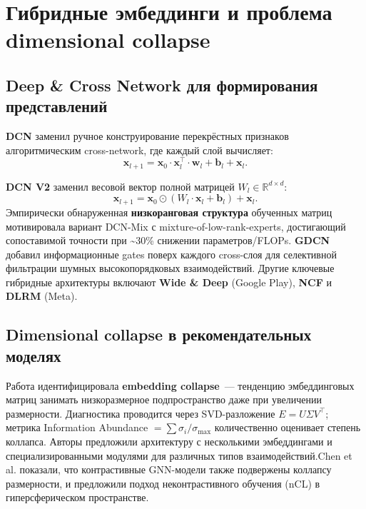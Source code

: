 \section{Гибридные эмбеддинги и проблема dimensional collapse}
\label{sec:ch1:embeddings}

\subsection{Deep \& Cross Network для формирования представлений}
\label{subsec:ch1:dcn}

\textbf{DCN} \cite{wang2017dcn} заменил ручное конструирование перекрёстных признаков алгоритмическим cross-network, где каждый слой вычисляет:
\begin{equation}
    \mathbf{x}_{l+1} = \mathbf{x}_0 \cdot \mathbf{x}_l^\top \cdot \mathbf{w}_l + \mathbf{b}_l + \mathbf{x}_l.
\end{equation}

\textbf{DCN V2} \cite{wang2021dcnv2} заменил весовой вектор полной матрицей $W_l \in \mathbb{R}^{d \times d}$:
\begin{equation}
    \mathbf{x}_{l+1} = \mathbf{x}_0 \odot (W_l \cdot \mathbf{x}_l + \mathbf{b}_l) + \mathbf{x}_l.
\end{equation}
Эмпирически обнаруженная \textbf{низкоранговая структура} обученных матриц мотивировала вариант DCN-Mix с mixture-of-low-rank-experts, достигающий сопоставимой точности при \textasciitilde30\% снижении параметров/FLOPs. \textbf{GDCN} \cite{wang2023gdcn} добавил информационные gates поверх каждого cross-слоя для селективной фильтрации шумных высокопорядковых взаимодействий. Другие ключевые гибридные архитектуры включают \textbf{Wide \& Deep} \cite{cheng2016widedeep} (Google Play), \textbf{NCF} \cite{he2017ncf} и \textbf{DLRM} \cite{naumov2019dlrm} (Meta).

\subsection{Dimensional collapse в рекомендательных моделях}
\label{subsec:ch1:collapse}

Работа \cite{guo2024collapse} идентифицировала \textbf{embedding collapse}~--- тенденцию эмбеддинговых матриц занимать низкоразмерное подпространство даже при увеличении размерности. 
Диагностика проводится через SVD-разложение $E = U\Sigma V^\top$; метрика Information Abundance $= \sum \sigma_i / \sigma_{\max}$ количественно оценивает степень коллапса. 
Авторы предложили архитектуру с несколькими эмбеддингами и специализированными модулями для различных типов взаимодействий.Chen et al. \cite{chen2024noncl} показали, что контрастивные GNN-модели также подвержены коллапсу размерности, и предложили подход неконтрастивного обучения (nCL) в гиперсферическом пространстве.

